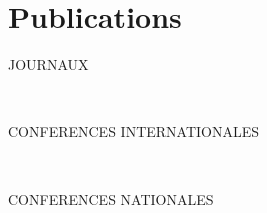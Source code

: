 \chapter*{Publications}


\begin{refsection}[ownpubs]

    \noindent JOURNAUX
    \small
    \nocite{soulej2025jaamas}

    \printbibliography[keyword=journal, heading=none]

    \

    \noindent CONFERENCES INTERNATIONALES
    \small
    \nocite{soule2024moise_marl}
    \nocite{soule2024marl}
    \nocite{soulej2023sim}
    \nocite{soulej2025cloud}
    \printbibliography[keyword=international, heading=none]

    \

    \noindent CONFERENCES NATIONALES
    \nocite{soule2023jfsmathese}
    \nocite{soule2023ressithese}
    \nocite{soule2023rjciathese}
    \nocite{soule2024outil}
    \nocite{soule2024approche}
    \printbibliography[keyword=national, heading=none]

\end{refsection}
